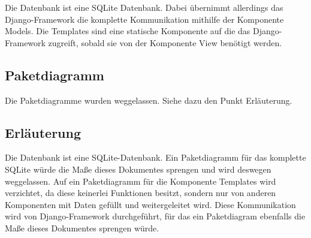 Die Datenbank ist eine SQLite Datenbank. Dabei übernimmt allerdings das
Django-Framework die komplette Kommunikation mithilfe der Komponente Models. 
Die Templates sind eine statische Komponente auf die das Django-Framework
zugreift, sobald sie von der Komponente View benötigt werden. 

\subsection{Paketdiagramm}
Die Paketdiagramme wurden weggelassen. Siehe dazu den Punkt Erläuterung.

\subsection{Erl\"auterung}
Die Datenbank ist eine SQLite-Datenbank. Ein Paketdiagramm für das komplette
SQLite würde die Maße dieses Dokumentes sprengen und wird deswegen weggelassen.
Auf ein Paketdiagramm für die Komponente Templates wird verzichtet, da diese
keinerlei Funktionen besitzt, sondern nur von anderen Komponenten mit Daten
gefüllt und weitergeleitet wird. Diese Kommunikation wird von Django-Framework
durchgeführt, für das ein Paketdiagram ebenfalls die Maße dieses Dokumentes
sprengen würde.
